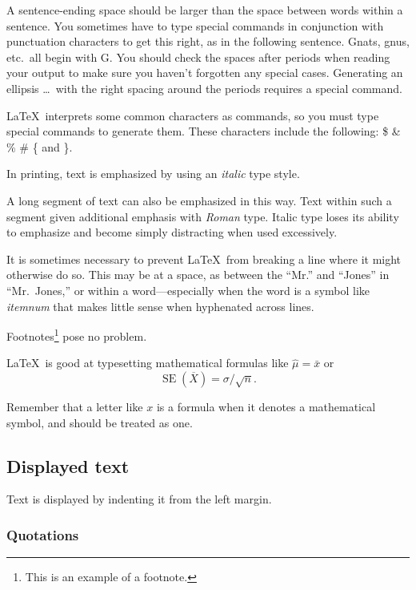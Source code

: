 A sentence-ending space should be larger than the space between words within a
sentence. You sometimes have to type special commands in conjunction with
punctuation characters to get this right, as in the following sentence. Gnats,
gnus, etc.\ all begin with G\@. You should check the spaces after periods when
reading your output to make sure you haven't forgotten any special cases.
Generating an ellipsis \ldots\ with the right spacing around the periods
requires a special command.


\LaTeX\ interprets some common characters as commands, so you must type special
commands to generate them. These characters include the following: \$ \& \% \#
\{ and \}.


In printing, text is emphasized by using an {\em italic\/} type style.


\begin{em}
  A long segment of text can also be emphasized in this way. Text within such a
  segment given additional emphasis with\/ {\em Roman} type. Italic type loses
  its ability to emphasize and become simply distracting when used excessively.
\end{em}


It is sometimes necessary to prevent \LaTeX\ from breaking a line where it
might otherwise do so. This may be at a space, as between the ``Mr.'' and
``Jones'' in ``Mr.~Jones,'' or within a word---especially when the word is a
symbol like \mbox{\em itemnum\/} that makes little sense when hyphenated across
lines.


Footnotes\footnote{This is an example of a footnote.} pose no problem.


\LaTeX\ is good at typesetting mathematical formulas like
$\widehat{\mu}=\bar{x}$ or
\[
  \operatorname{SE}(\overline{X}) = \sigma/\sqrt{n}.
\]


Remember that a letter like $x$ is a formula when it denotes a mathematical
symbol, and should be treated as one.


\subsection{Displayed text}


Text is displayed by indenting it from the left margin.


\subsubsection{Quotations}


